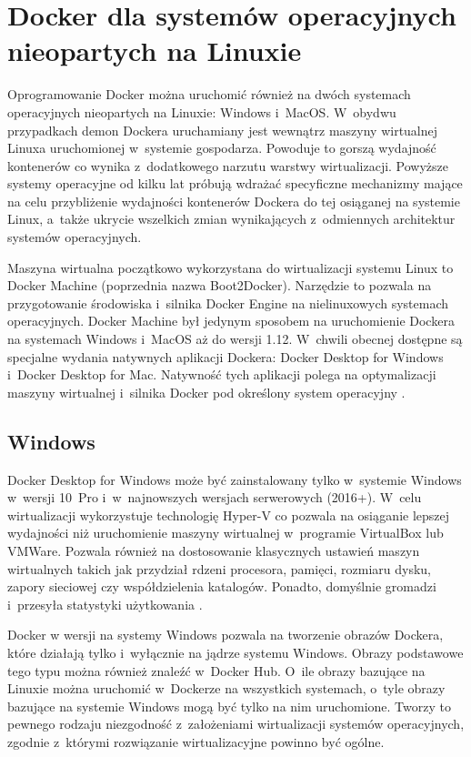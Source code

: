 \section{Docker dla systemów operacyjnych nieopartych na Linuxie}

Oprogramowanie Docker można uruchomić również na dwóch systemach operacyjnych nieopartych na Linuxie: Windows i~MacOS. W~obydwu przypadkach demon Dockera uruchamiany jest wewnątrz maszyny wirtualnej Linuxa uruchomionej w~systemie gospodarza. Powoduje to gorszą wydajność kontenerów co wynika z~dodatkowego narzutu warstwy wirtualizacji. Powyższe systemy operacyjne od kilku lat próbują wdrażać specyficzne mechanizmy mające na celu przybliżenie wydajności kontenerów Dockera do tej osiąganej na systemie Linux, a~także ukrycie wszelkich zmian wynikających z~odmiennych architektur systemów operacyjnych.

Maszyna wirtualna początkowo wykorzystana do wirtualizacji systemu Linux to Docker Machine (poprzednia nazwa Boot2Docker). Narzędzie to pozwala na przygotowanie środowiska i~silnika Docker Engine na nielinuxowych systemach operacyjnych. Docker Machine był jedynym sposobem na uruchomienie Dockera na systemach Windows i~MacOS aż do wersji 1.12. W~chwili obecnej dostępne są specjalne wydania natywnych aplikacji Dockera: Docker Desktop for Windows i~Docker Desktop for Mac. Natywność tych aplikacji polega na optymalizacji maszyny wirtualnej i~silnika Docker pod określony system operacyjny \cite{DockerMachine}.

\subsection{Windows}

Docker Desktop for Windows może być zainstalowany tylko w~systemie Windows w~wersji 10~Pro i~w~najnowszych wersjach serwerowych (2016+). W~celu wirtualizacji wykorzystuje technologię Hyper-V co pozwala na osiąganie lepszej wydajności niż uruchomienie maszyny wirtualnej w~programie VirtualBox lub VMWare. Pozwala również na dostosowanie klasycznych ustawień maszyn wirtualnych takich jak przydział rdzeni procesora, pamięci, rozmiaru dysku, zapory sieciowej czy współdzielenia katalogów. Ponadto, domyślnie gromadzi i~przesyła statystyki użytkowania \cite{DockerForWindows}.

Docker w wersji na systemy Windows pozwala na tworzenie obrazów Dockera, które działają tylko i~wyłącznie na jądrze systemu Windows. Obrazy podstawowe tego typu można również znaleźć w~Docker Hub. O~ile obrazy bazujące na Linuxie można uruchomić w~Dockerze na wszystkich systemach, o~tyle obrazy bazujące na systemie Windows mogą być tylko na nim uruchomione. Tworzy to pewnego rodzaju niezgodność z~założeniami wirtualizacji systemów operacyjnych, zgodnie z~którymi rozwiązanie wirtualizacyjne powinno być ogólne.

